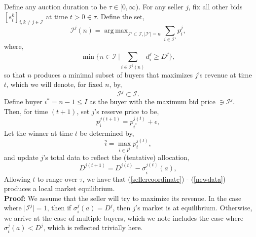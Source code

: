 \documentclass[12pt]{article}
\theoremstyle{definition}
\newcommand{\mcI}{\mathcal{I}}
\newcommand{\g}{\sigma}
\DeclareMathOperator*{\argmax}{arg\,max}
\begin{document}
\begin{multicols}{2}
{
\label{sellerstrategy}
Define any auction duration to be $\tau \in [0,\infty)$. 
For any seller $j$, fix all other bids $[s_i^k]_{i,k\ne j \in\mcI}$ at time $t>0\in\tau$.
Define the set,
$$
    \mcI^j(n) =\argmax_{{\mcI}' \subset \mcI, \vert{\mcI}'\vert =
n}\sum_{i\in{\mcI}'} p_i^j,
$$
where,
\begin{equation}\label{sellercoordinate}
    \min\bigg\lbrace n \in\mcI \ \bigg\vert\displaystyle\sum_{i\in\mcI^j(n)}d_i^j
\ge D^j \bigg\rbrace,
\end{equation} 
so that $n$ produces a minimal subset 
of buyers that maximizes $j$'s revenue at time $t$, which we will
denote, for fixed $n$, by,
\begin{equation}\label{buyers}
    \mcI^j \subset \mcI.
\end{equation} 
Define buyer $i^* = n-1 \le I$ as the buyer with the maximum bid price $\ni
\mcI^j$.
Then, for time $(t+1)$, set $j$'s reserve price to be, 
\begin{equation}\label{newprice}
    p_i^{j(t+1)} = p_{i^*}^{j(t)} + \epsilon,
\end{equation}
Let the winner at time $t$ be determined by,
\begin{equation}\label{winner}
    \bar{i} = \displaystyle\max_{i\in I^j} p_i^{j(t)},
\end{equation}
and update $j$'s total data to reflect the (tentative) allocation,
\begin{equation}\label{newdata}
    D^{j(t+1)} = D^{j(t)} - \g_{\bar{i}}^{j(t)}(a),
\end{equation}
Allowing $t$ to range over $\tau$, we have that (\ref{sellercoordinate}) -
(\ref{newdata}) produces a local market equilibrium. 
}\\
\textbf{Proof:}
We assume that the seller will try to maximize its revenue. In the case where
$\vert\mcI^j\vert =1$, then if $\g_i^j(a)=D^j$, then $j$'s market is at equilibrium.
Otherwise, we arrive at the case of multiple buyers, which we note includes the
case where $\g_i^j(a) < D^j$, which is reflected trivially here.


\end{multicols}
\end{document}
